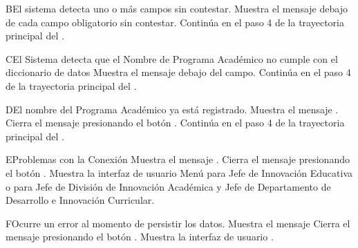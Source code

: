 
\begin{UCtrayectoriaA}{B}{El sistema detecta uno o más campos sin contestar.}
    \UCpaso Muestra el mensaje  debajo de cada campo obligatorio sin contestar.
    \UCpaso Continúa en el paso 4 de la trayectoria principal del .

\end{UCtrayectoriaA}

\begin{UCtrayectoriaA}{C}{El Sistema detecta que el Nombre de Programa Académico no cumple con el diccionario de datos}
    \UCpaso Muestra el mensaje  debajo del campo.
    \UCpaso Continúa en el paso 4 de la trayectoria principal del .
\end{UCtrayectoriaA}

\begin{UCtrayectoriaA}{D}{El nombre del Programa Académico ya está registrado.}
    \UCpaso Muestra el mensaje .
    \UCpaso[\UCactor] Cierra el mensaje presionando el botón .
    \UCpaso Continúa en el paso 4 de la trayectoria principal del .
\end{UCtrayectoriaA}
\begin{UCtrayectoriaA}{E}{Problemas con la Conexión}
    \UCpaso Muestra el mensaje .
    \UCpaso[\UCactor] Cierra el mensaje presionando el botón .
    \UCpaso Muestra la interfaz de usuario Menú para Jefe de Innovación Educativa  o  para Jefe de División de Innovación Académica y Jefe de Departamento de Desarrollo e Innovación Curricular.
\end{UCtrayectoriaA}

\begin{UCtrayectoriaA}{F}{Ocurre un error al momento de persistir los datos.}
    \UCpaso Muestra el mensaje 
    \UCpaso[\UCactor] Cierra el mensaje presionando el botón .
    \UCpaso Muestra la interfaz de usuario .
\end{UCtrayectoriaA}

